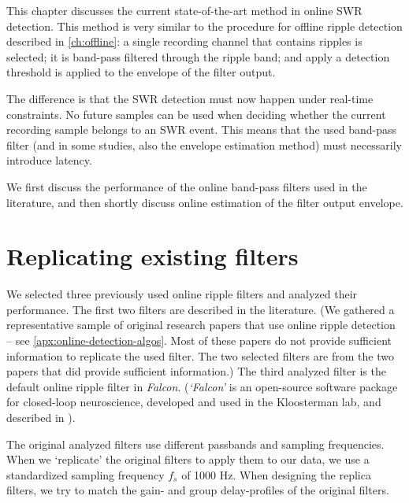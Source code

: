 \label{ch:BPF}

This chapter discusses the current state-of-the-art method in online SWR detection. This method is very similar to the procedure for offline ripple detection described in \cref{ch:offline}: a single recording channel that contains ripples is selected; it is band-pass filtered through the ripple band; and apply a detection threshold is applied to the envelope of the filter output.

The difference is that the SWR detection must now happen under real-time constraints. No future samples can be used when deciding whether the current recording sample belongs to an SWR event. This means that the used band-pass filter (and in some studies, also the envelope estimation method) must necessarily introduce latency.

We first discuss the performance of the online band-pass filters used in the literature, and then shortly discuss online estimation of the filter output envelope.




\section{Replicating existing filters}

We selected three previously used online ripple filters and analyzed their performance. The first two filters are described in the literature. (We gathered a representative sample of original research papers that use online ripple detection -- see \cref{apx:online-detection-algos}. Most of these papers do not provide sufficient information to replicate the used filter. The two selected filters are from the two papers that did provide sufficient information.)
The third analyzed filter is the default online ripple filter in \emph{Falcon}. (\emph{`Falcon'} is an open-source software package for closed-loop neuroscience, developed and used in the Kloosterman lab, and described in ).

The original analyzed filters use different passbands and sampling frequencies. When we `replicate' the original filters to apply them to our data, we use a standardized sampling frequency $f_s$ of 1000 Hz. When designing the replica filters, we try to match the gain- and group delay-profiles of the original filters.


